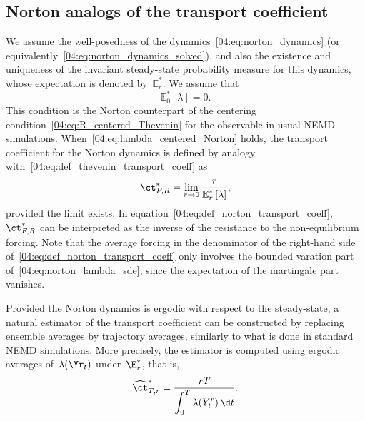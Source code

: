 \subsection{Norton analogs of the transport coefficient}\label{04:subsec:norton_tc}
We assume the well-posedness of the dynamics~\eqref{04:eq:norton_dynamics} (or equivalently~\eqref{04:eq:norton_dynamics_solved}), and also the existence and uniqueness of the invariant steady-state probability measure for this dynamics, whose expectation is denoted by~$\mathbb{E}_{r}^*$. We assume that
\begin{equation}
   \label{04:eq:lambda_centered_Norton}
   \mathbb{E}_0^*[\lambda]=0.
\end{equation}
This condition is the Norton counterpart of the centering  condition~\eqref{04:eq:R_centered_Thevenin} for the observable in usual NEMD simulations. When~\eqref{04:eq:lambda_centered_Norton} holds, the transport coefficient for the Norton dynamics is defined by analogy with~\eqref{04:eq:def_thevenin_transport_coeff} as
\begin{equation}
    \label{04:eq:def_norton_transport_coeff}
    \ct_{F,R}^* = \underset{r\to 0}{\lim}\,\frac{r}{\displaystyle{\mathbb{E}_r^* \left[\lambda\right]}},
\end{equation}
provided the limit exists. In equation~\eqref{04:eq:def_norton_transport_coeff},~$\ct_{F,R}^*$ can be interpreted as the inverse of the resistance to the non-equilibrium forcing. Note that the average forcing in the denominator of the right-hand side of~\eqref{04:eq:def_norton_transport_coeff} only involves the bounded varation part of~\eqref{04:eq:norton_lambda_sde}, since the expectation of the martingale part vanishes.

Provided the Norton dynamics is ergodic with respect to the steady-state, a natural estimator of the transport coefficient can be constructed by replacing ensemble averages by trajectory averages, similarly to what is done in standard NEMD simulations. More precisely, the estimator is computed using ergodic averages of~$\lambda(\Yr_t)$ under~$\E_r^*$,
that is,
\begin{equation}
\label{04:eq:norton_rho_estimator_continuous_time}
    \widehat{\ct}_{T,r}^*= \frac{rT}{\displaystyle{\int_{0}^T \lambda(Y_t^r)\,\d t}}.
\end{equation}

